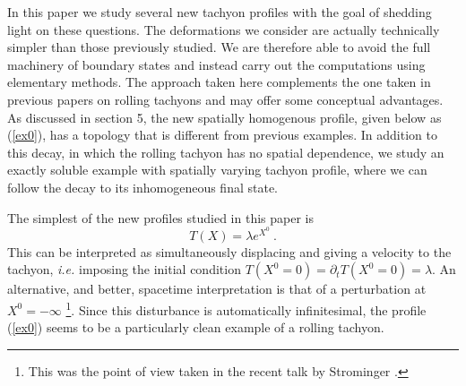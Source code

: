 \documentclass[a4paper,12pt]{article}
\begin{document}
In this paper we study  several new tachyon profiles with the goal of shedding light on these questions. The deformations  we consider are actually technically simpler than those 
previously studied. We are therefore able to avoid the full machinery of boundary states and instead carry out 
the computations using elementary methods. The approach taken here complements the one taken in previous papers on rolling tachyons and may offer some conceptual advantages. 
As discussed in section 5, the new spatially homogenous profile, given below as (\ref{ex0}), 
has a topology that is different from previous examples. 
In addition to this decay, in which the rolling tachyon has no spatial dependence, we study 
an exactly soluble example with spatially varying tachyon profile, where we can follow
the decay to its inhomogeneous final state. 


The simplest of the new profiles studied in this paper is 
\begin{equation}
T(X) = \lambda e^{X^0}~.
\label{ex0}
\end{equation}
This can be interpreted as simultaneously displacing 
and giving a velocity to the tachyon, {\it i.e.} imposing the initial condition 
$T(X^0=0)=\partial_t T(X^0=0)=\lambda$. An alternative, and better, spacetime interpretation is 
that of a perturbation at $X^0=-\infty$ \footnote{This was the point of view taken in the recent talk
by Strominger \cite{Strominger:2002pc}.}. Since this disturbance is automatically infinitesimal, 
the profile (\ref{ex0}) seems to be a particularly clean example of a rolling tachyon.
\end{document}
